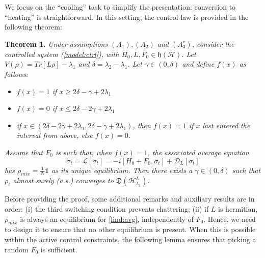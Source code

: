 \documentclass[conference]{IEEEtran}
\newcommand{\one}{\mathds{1}}
\theoremstyle{plain}
\newtheorem{thm}{Theorem}[section]
\theoremstyle{plain}
\theoremstyle{plain}
\theoremstyle{plain}
\theoremstyle{remark}
\theoremstyle{definition}
\begin{document}
We focus on the ``cooling'' task to simplify the presentation: conversion to ``heating'' is straightforward. In this setting, the control law is provided in the following theorem: \begin{thm}
    Under assumptions $(A_1), (A_2)$ and $(A_3^c)$, consider the controlled system (\ref{model:ctrl}), with $H_0, L, F_0 \in \mathfrak h(\mathcal H)$. Let $V(\rho) = Tr[L\rho] - \lambda_1$ and $\delta = \lambda_2 - \lambda_1$. Let $\gamma \in (0, \delta)$ and define $f(x)$ as follows: \begin{itemize}
        \item $f(x) = 1$ if $x \ge 2\delta - \gamma + 2\lambda_1$
        \item $f(x) = 0$ if $x \le 2\delta - 2\gamma + 2\lambda_1$
        \item if $x \in (2\delta - 2\gamma + 2\lambda_1, 2\delta - \gamma + 2\lambda_1)$, then $f(x) = 1$ if $x$ last entered the interval from above, else $f(x) = 0$.
    \end{itemize}
    Assume that $F_0$ is such that, when $f(x) = 1$, the associated average equation \begin{equation}
        \dot \sigma_t = \mathscr L[\sigma_t] = -i[H_0 + F_0, \sigma_t] + \mathcal D_L[\sigma_t] \label{lind:avg}
    \end{equation}
    has $\rho_{mix} = \frac{1}{N}\one$ as its unique equilibrium. Then there exists a $\gamma \in (0, \delta)$ such that $\rho_t$ almost surely (a.s.) converges to 
    $\mathfrak D(\mathcal H_{\lambda_1}^L).$
    \label{convthm}
\end{thm}
Before providing the proof, some additional remarks and auxiliary results are in order: (i) the third switching condition prevents chattering; 
(ii) if $L$ is hermitian, $\rho_{mix}$ is always an equilibrium for \eqref{lind:avg}, independently of  $F_0$. Hence, we need to design it to ensure that no other equilibrium is present. When this is possible within the active control constraints, the following lemma ensures that picking a random $F_0$ is sufficient. 
\end{document}
